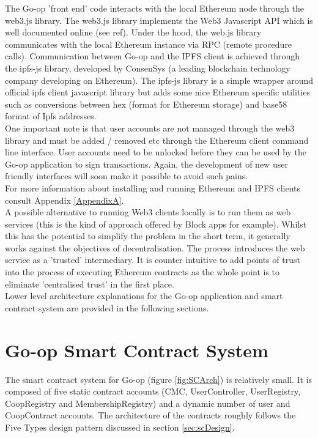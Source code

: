 The Go-op 'front end' code interacts with the local Ethereum node through the web3.js library\cite{Web3JS}. The web3.js library implements the Web3 Javascript API\cite{JavascriptAPI} which is well documented online (see ref). Under the hood, the web.js library communicates with the local Ethereum instance via RPC (remote procedure calls). Communication between Go-op and the IPFS client is achieved through the ipfs-js\cite{ipfs-js} library, developed by ConsenSys (a leading blockchain technology company developing on Ethereum). The ipfs-js library is a simple wrapper around official ipfs client javascript library but adds some nice Ethereum specific utilities such as conversions between hex (format for Ethereum storage) and base58 format of Ipfs addresses. \\

One important note is that user accounts are not managed through the web3 library and must be added / removed etc through the Ethereum client command line interface. User accounts need to be unlocked before they can be used by the Go-op application to sign transactions. Again, the development of new user friendly interfaces will soon make it possible to avoid such pains. \\

For more information about installing and running Ethereum and IPFS clients consult Appendix \ref{AppendixA}. \\

A possible alternative to running Web3 clients locally is to run them as web services (this is the kind of approach offered by Block apps\cite{BlockApps} for example). Whilst this has the potential to simplify the problem in the short term, it generally works against the objectives of decentralisation. The process introduces the web service as a 'trusted' intermediary. It is counter intuitive to add points of trust into the process of executing Ethereum contracts as the whole point is to eliminate 'centralised trust' in the first place. \\

Lower level architecture explanations for the Go-op application and smart contract system are provided in the following sections. \\

\section{Go-op Smart Contract System}
The smart contract system for Go-op (figure \ref{fig:SCArch}) is relatively small. It is composed of five static contract accounts (CMC, UserController, UserRegistry, CoopRegistry and MembershipRegistry) and a dynamic number of user and CoopContract accounts. The architecture of the contracts roughly follows the Five Types design pattern discussed in section \ref{sec:scDesign}.\\ 

